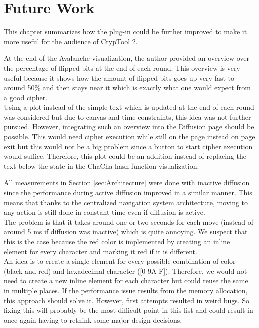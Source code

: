 
\chapter{Future Work}
\label{chap:futureWork}

This chapter summarizes how the plug-in could be further improved to make it more useful for the audience of CrypTool 2.

\begin{description}[style=nextline]

\item[Better overview over flipped bits at the end of each round]

At the end of the Avalanche visualization, the author provided an overview over the percentage of flipped bits at the end of each round. This overview is very useful because it shows how the amount of flipped bits goes up very fast to around 50\% and then stays near it which is exactly what one would expect from a good cipher. \\
Using a plot instead of the simple text which is updated at the end of each round was considered but due to canvas and time constraints, this idea was not further pursued. However, integrating such an overview into the Diffusion page should be possible. This would need cipher execution while still on the page instead on page exit but this would not be a big problem since a button to start cipher execution would suffice. Therefore, this plot could be an addition instead of replacing the text below the state in the ChaCha hash function visualization.

\item[Improve performance during diffusion]

All measurements in Section \ref{sec:Architecture} were done with inactive diffusion since the performance during active diffusion improved in a similar manner. This means that thanks to the centralized navigation system architecture, moving to any action is still done in constant time even if diffusion is active. \\
The problem is that it takes around one or two seconds for each move (instead of around 5 ms if diffusion was inactive) which is quite annoying. We suspect that this is the case because the red color is implemented by creating an inline element for every character and marking it red if it is different. \\
An idea is to create a single element for every possible combination of color (black and red) and hexadecimal character ([0-9A-F]). Therefore, we would not need to create a new inline element for each character but could reuse the same in multiple places. If the performance issue results from the memory allocation, this approach should solve it. However, first attempts resulted in weird bugs. So fixing this will probably be the most difficult point in this list and could result in once again having to rethink some major design decisions.


\end{description}

